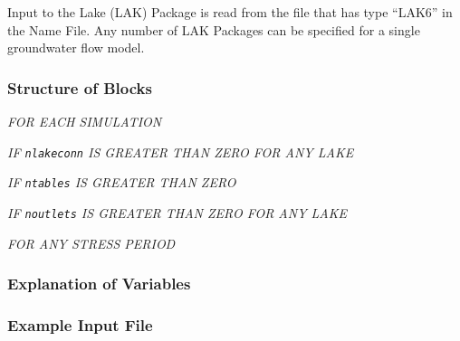 Input to the Lake (LAK) Package is read from the file that has type ``LAK6'' in the Name File.  Any number of LAK Packages can be specified for a single groundwater flow model.

\vspace{5mm}
\subsubsection{Structure of Blocks}
\vspace{5mm}

\noindent \textit{FOR EACH SIMULATION}



\noindent \textit{IF \texttt{nlakeconn} IS GREATER THAN ZERO FOR ANY LAKE}

\noindent \textit{IF \texttt{ntables} IS GREATER THAN ZERO}

\noindent \textit{IF \texttt{noutlets} IS GREATER THAN ZERO FOR ANY LAKE}


\vspace{5mm}
\noindent \textit{FOR ANY STRESS PERIOD}


\vspace{5mm}
\subsubsection{Explanation of Variables} \label{sec:lakparams}
\begin{description}

\end{description}

\vspace{5mm}
\subsubsection{Example Input File}


\vspace{5mm}
